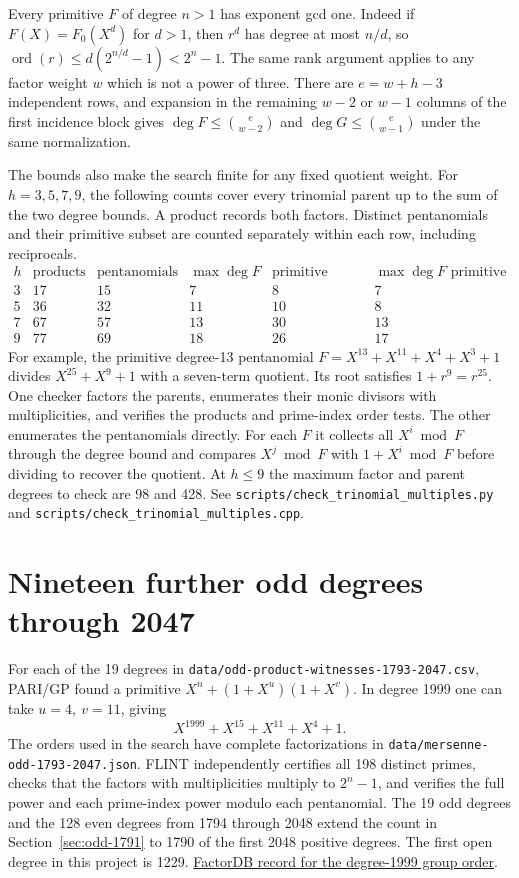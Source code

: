 \documentclass[11pt]{article}
\newcommand{\ord}{\operatorname{ord}}
\begin{document}
Every primitive \(F\) of degree \(n>1\) has exponent gcd one.
Indeed if \(F(X)=F_0(X^d)\) for \(d>1\), then \(r^d\) has degree at
most \(n/d\), so \(\ord(r)\le d(2^{n/d}-1)<2^n-1\).
The same rank argument applies to any factor weight \(w\) which is
not a power of three. There are \(e=w+h-3\) independent rows,
and expansion in the remaining \(w-2\) or \(w-1\) columns of the
first incidence block gives \(\deg F\le\binom{e}{w-2}\) and
\(\deg G\le\binom{e}{w-1}\) under the same normalization.

The bounds also make the search finite for any fixed quotient weight.
For \(h=3,5,7,9\), the following counts cover every trinomial parent
up to the sum of the two degree bounds. A product records both
factors. Distinct pentanomials and their primitive subset are counted
separately within each row, including reciprocals.
\[
\begin{array}{r|r|r|r|r|r}
h&\text{products}&\text{pentanomials}&\max\deg F&
 \text{primitive pentanomials}&\max\deg F\text{ primitive}\\ \hline
3&17&15&7&8&7\\
5&36&32&11&10&8\\
7&67&57&13&30&13\\
9&77&69&18&26&17
\end{array}
\]
For example, the primitive degree-13 pentanomial
\(F=X^{13}+X^{11}+X^4+X^3+1\) divides \(X^{25}+X^9+1\)
with a seven-term quotient. Its root satisfies \(1+r^9=r^{25}\).
One checker factors the parents, enumerates their monic divisors
with multiplicities, and verifies the products and prime-index order
tests. The other enumerates the pentanomials directly. For each \(F\)
it collects all \(X^i\bmod F\) through the degree bound and compares
\(X^j\bmod F\) with \(1+X^i\bmod F\) before dividing to recover the
quotient. At \(h\le9\) the maximum factor and parent degrees to check
are 98 and 428. See \nolinkurl{scripts/check_trinomial_multiples.py}
and \nolinkurl{scripts/check_trinomial_multiples.cpp}.

\section{Nineteen further odd degrees through 2047}\label{sec:odd-2047}
For each of the 19 degrees in \nolinkurl{data/odd-product-witnesses-1793-2047.csv},
PARI/GP found a primitive \(X^n+(1+X^u)(1+X^v)\).
In degree 1999 one can take \(u=4,\ v=11\), giving
\[
 X^{1999}+X^{15}+X^{11}+X^4+1 .
\]
The orders used in the search have complete factorizations in
\nolinkurl{data/mersenne-odd-1793-2047.json}.
FLINT independently certifies all 198 distinct primes, checks that
the factors with multiplicities multiply to \(2^n-1\), and verifies
the full power and each prime-index power modulo each pentanomial.
The 19 odd degrees and the 128 even degrees from 1794 through 2048
extend the count in Section~\ref{sec:odd-1791} to 1790 of the first
2048 positive degrees. The first open degree in this project is 1229.
\href{https://factordb.com/index.php?query=2%5E1999-1}{FactorDB record
for the degree-1999 group order}.
\end{document}
